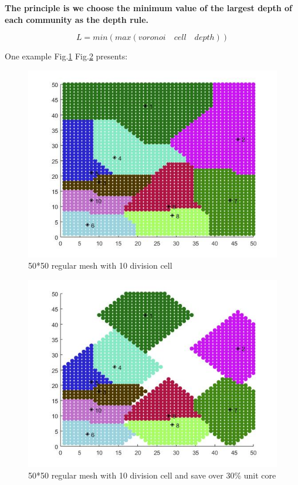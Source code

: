 \vspace*{20pt}
\textbf{
The principle is we choose the minimum value of the largest depth of each community as the depth rule.}

$$L =  min(max(voronoi \quad cell \quad depth))$$

\vspace*{20pt}

One example Fig.\ref{voronoi} Fig.\ref{voronoisave} presents:
\\

\begin{figure}[h]
\centering\includegraphics[width=0.8\linewidth]{figure/voronoi}
\caption{50*50 regular mesh with 10 division cell}
\label{voronoi}
\end{figure}

\begin{figure}[h]
\centering\includegraphics[width=0.8\linewidth]{figure/voronoisave}
\caption{50*50 regular mesh with 10 division cell and save over 30\% unit core}
\label{voronoisave}
\end{figure}

